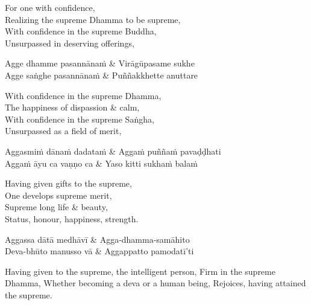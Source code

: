 \begin{english}
  For one with confidence,\\
  Realizing the supreme Dhamma to be supreme,\\
  With confidence in the supreme Buddha,\\
  Unsurpassed in deserving offerings,
\end{english}

\begin{twochants}
  Agge dhamme pasannānaṁ & Virāgūpasame sukhe\\
  Agge saṅghe pasannānaṁ & Puññakkhette anuttare\\
\end{twochants}

\begin{english}
  With confidence in the supreme Dhamma,\\
  The happiness of dispassion & calm,\\
  With confidence in the supreme Saṅgha,\\
  Unsurpassed as a field of merit,
\end{english}

\begin{twochants}
  Aggasmiṁ dānaṁ dadataṁ & Aggaṁ puññaṁ pavaḍḍhati\\
  Aggaṁ āyu ca vaṇṇo ca & Yaso kitti sukhaṁ balaṁ\\
\end{twochants}

\begin{english}
  Having given gifts to the supreme,\\
  One develops supreme merit,\\
  Supreme long life & beauty,\\
  Status, honour, happiness, strength.
\end{english}

\begin{twochants}
  Aggassa dātā medhāvī & Agga-dhamma-samāhito\\
  Deva-bhūto manusso vā & Aggappatto pamodatī'ti
\end{twochants}

\begin{english}
  Having given to the supreme, the intelligent person,
  Firm in the supreme Dhamma,
  Whether becoming a deva or a human being,
  Rejoices, having attained the supreme.
\end{english}



